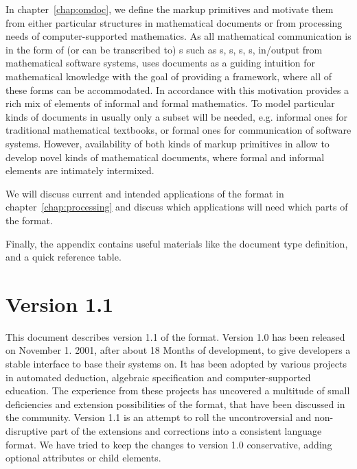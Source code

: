 In chapter~\ref{chap:omdoc}, we define the {\omdoc} markup primitives and motivate
them from either particular structures in mathematical documents or from
processing needs of computer-supported mathematics. As all mathematical
communication is in the form of (or can be transcribed to) {}s such as {}s,
{}s, {}s, {}s, in/output from
mathematical software systems, {\omdoc} uses documents as a guiding intuition for
mathematical knowledge with the goal of providing a framework, where all of these
forms can be accommodated. In accordance with this motivation {\omdoc} provides a
rich mix of elements of informal and formal mathematics. To model particular kinds
of documents in {\omdoc} usually only a subset will be needed, e.g. informal ones
for traditional mathematical textbooks, or formal ones for communication of
software systems. However, availability of both kinds of markup primitives in
{\omdoc} allow to develop novel kinds of mathematical documents, where formal and
informal elements are intimately intermixed.

We will discuss current and intended applications of the {\omdoc} format in
chapter~\ref{chap:processing} and discuss which applications will need which parts
of the {\omdoc} format. 

Finally, the appendix contains useful materials like the {\omdoc} document type
definition, and a quick reference table. 

\section*{{\omdoc} Version 1.1}

This document describes version 1.1 of the {\omdoc} format. Version 1.0 has been
released on November 1. 2001, after about 18 Months of development, to give
developers a stable interface to base their systems on. It has been adopted by
various projects in automated deduction, algebraic specification and
computer-supported education. The experience from these projects has uncovered a
multitude of small deficiencies and extension possibilities of the format, that
have been discussed in the {\omdoc} community. Version 1.1 is an attempt to roll
the uncontroversial and non-disruptive part of the extensions and corrections into
a consistent language format. We have tried to keep the changes to version 1.0
conservative, adding optional attributes or child elements.

